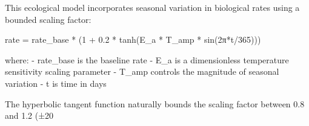 This ecological model incorporates seasonal variation in biological rates using a bounded scaling factor:

rate = rate_base * (1 + 0.2 * tanh(E_a * T_amp * sin(2π*t/365)))

where:
- rate_base is the baseline rate
- E_a is a dimensionless temperature sensitivity scaling parameter
- T_amp controls the magnitude of seasonal variation
- t is time in days

The hyperbolic tangent function naturally bounds the scaling factor between 0.8 and 1.2 (±20%
